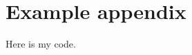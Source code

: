 %
%

\section{Example appendix}

Here is my code.

\begin{singlespacing} 
\begin{small}
\end{small}
\end{singlespacing}
